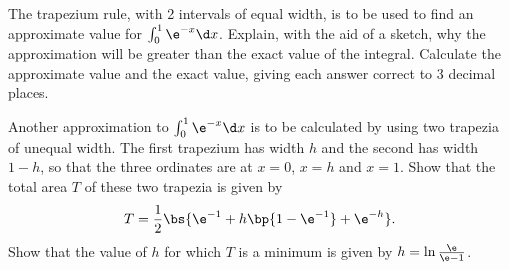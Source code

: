 \begin{problem}
    The trapezium rule, with 2 intervals of equal width, is to be used to find an approximate value for $\int_{0}^{1}\e^{-x} \d x$. Explain, with the aid of a sketch, why the approximation will be greater than the exact value of the integral. Calculate the approximate value and the exact value, giving each answer correct to 3 decimal places.

    Another approximation to $\int_{0}^{1}\e^{-x} \d x$ is to be calculated by using two trapezia of unequal width. The first trapezium has width $h$ and the second has width $1-h$, so that the three ordinates are at $x=0$, $x=h$ and $x=1$. Show that the total area $T$ of these two trapezia is given by \[T = \frac12 \bs{\e^{-1} + h \bp{1 - \e^{-1}} + \e^{-h}}.\] Show that the value of $h$ for which $T$ is a minimum is given by $h=\ln \frac{\e}{\e - 1}$. 
\end{problem}
